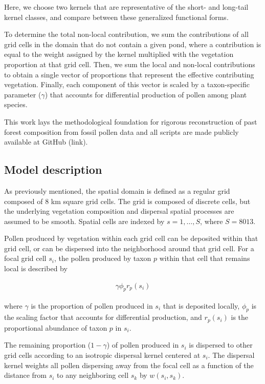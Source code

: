 \documentclass[12pt]{article}
\begin{document}
Here, we choose two kernels that are representative of the short- and
long-tail kernel classes, and compare between these generalized
functional forms.


To determine the total non-local contribution, we sum the
contributions of all grid cells in the domain that do not contain a
given pond, where a contribution is equal to the weight assigned by
the kernel multiplied with the vegetation proportion at that grid
cell. Then, we sum the local and non-local contributions to obtain a
single vector of proportions that represent the effective contributing
vegetation. Finally, each component of this vector is scaled by a
taxon-specific parameter ($\gamma$) that accounts for differential
production of pollen among plant species.

This work lays the methodological foundation for rigorous
reconstruction of past forest composition from fossil pollen data and
all scripts are made publicly available at GitHub (link).

\subsection{Model description}

As previously mentioned, the spatial domain is defined as a regular
grid composed of 8 km square grid cells. The grid is composed of
discrete cells, but the underlying vegetation composition and
dispersal spatial processes are assumed to be smooth. Spatial cells
are indexed by $s=1,\ldots,S$, where $S=8013$.

Pollen produced by vegetation within each grid cell can be deposited
within that grid cell, or can be dispersed into the neighborhood
around that grid cell. For a focal grid cell $s_i$, the pollen
produced by taxon $p$ within that cell that remains local is described
by

\begin{align}
\gamma \phi_p r_p(s_i)
\end{align} 

where $\gamma$ is the proportion of pollen produced in $s_i$ that is deposited locally,
$\phi_p$ is the scaling factor that accounts for differential
production, and $r_p(s_i)$ is the proportional abundance of taxon $p$
in $s_i$.

The remaining proportion ($1-\gamma$) of pollen produced in $s_i$ is
dispersed to other grid cells according to an isotropic dispersal
kernel centered at $s_i$. The dispersal kernel weights all pollen
dispersing away from the focal cell as a function of the distance from
$s_i$ to any neighboring cell $s_k$ by $w(s_i, s_k)$. 
\end{document}
